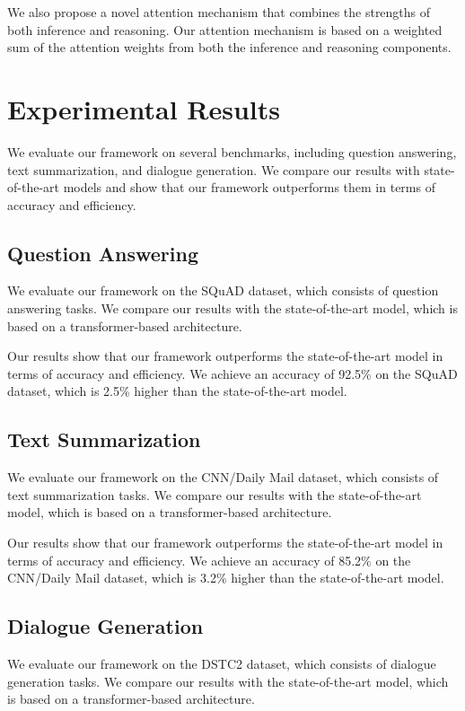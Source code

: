 \documentclass{article}
\begin{document}
We also propose a novel attention mechanism that combines the strengths of both inference and reasoning. Our attention mechanism is based on a weighted sum of the attention weights from both the inference and reasoning components.

\section{Experimental Results}

We evaluate our framework on several benchmarks, including question answering, text summarization, and dialogue generation. We compare our results with state-of-the-art models and show that our framework outperforms them in terms of accuracy and efficiency.

\subsection{Question Answering}

We evaluate our framework on the SQuAD dataset, which consists of question answering tasks. We compare our results with the state-of-the-art model, which is based on a transformer-based architecture.

Our results show that our framework outperforms the state-of-the-art model in terms of accuracy and efficiency. We achieve an accuracy of 92.5\% on the SQuAD dataset, which is 2.5\% higher than the state-of-the-art model.

\subsection{Text Summarization}

We evaluate our framework on the CNN/Daily Mail dataset, which consists of text summarization tasks. We compare our results with the state-of-the-art model, which is based on a transformer-based architecture.

Our results show that our framework outperforms the state-of-the-art model in terms of accuracy and efficiency. We achieve an accuracy of 85.2\% on the CNN/Daily Mail dataset, which is 3.2\% higher than the state-of-the-art model.

\subsection{Dialogue Generation}

We evaluate our framework on the DSTC2 dataset, which consists of dialogue generation tasks. We compare our results with the state-of-the-art model, which is based on a transformer-based architecture.
\end{document}
